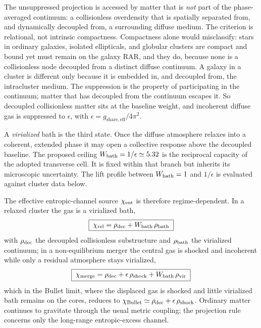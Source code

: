 \documentclass[11pt]{article}
\begin{document}
The unsuppressed projection is accessed by matter that is \emph{not} part of the phase-averaged continuum: a collisionless overdensity that is spatially separated from, and dynamically decoupled from, a surrounding diffuse medium. The criterion is relational, not intrinsic compactness. Compactness alone would misclassify: stars in ordinary galaxies, isolated ellipticals, and globular clusters are compact and bound yet must remain on the galaxy RAR, and they do, because none is a collisionless node decoupled from a distinct diffuse continuum. A galaxy in a cluster is different only because it is embedded in, and decoupled from, the intracluster medium. The suppression is the property of participating in the continuum; matter that has decoupled from the continuum escapes it. So decoupled collisionless matter sits at the baseline weight, and incoherent diffuse gas is suppressed to $\epsilon$, with $\epsilon=g_{\mathrm{share,eff}}/4\pi^2$.

A \emph{virialized} bath is the third state. Once the diffuse atmosphere relaxes into a coherent, extended phase it may open a collective response above the decoupled baseline. The proposed ceiling $W_{\rm bath}=1/\epsilon\simeq5.32$ is the reciprocal capacity of the adopted transverse cell. It is fixed within that branch but inherits its microscopic uncertainty. The lift profile between $W_{\rm bath}=1$ and $1/\epsilon$ is evaluated against cluster data below.

The effective entropic-channel source $\chi_{\rm ent}$ is therefore regime-dependent. In a relaxed cluster the gas is a virialized bath,
\[
\boxed{\;
\chi_{\rm rel}=\rho_{\rm dec}+W_{\rm bath}\,\rho_{\rm bath}\;}
\]
with $\rho_{\rm dec}$ the decoupled collisionless substructure and $\rho_{\rm bath}$ the virialized continuum; in a non-equilibrium merger the central gas is shocked and incoherent while only a residual atmosphere stays virialized,
\[
\boxed{\;
\chi_{\rm merge}=\rho_{\rm dec}+\epsilon\,\rho_{\rm shock}+W_{\rm bath}\,\rho_{\rm vir}\;}
\]
which in the Bullet limit, where the displaced gas is shocked and little virialized bath remains on the cores, reduces to $\chi_{\rm Bullet}\simeq\rho_{\rm dec}+\epsilon\,\rho_{\rm shock}$. Ordinary matter continues to gravitate through the usual metric coupling; the projection rule concerns only the long-range entropic-excess channel.
\end{document}
